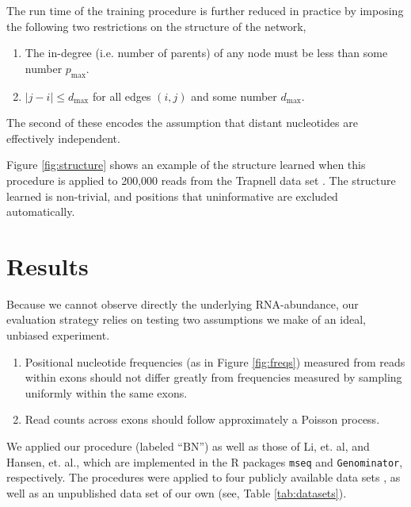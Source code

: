 \documentclass{bioinfo}
\begin{document}
The run time of the training procedure is further reduced in practice by imposing the
following two restrictions on the structure of the network,
\begin{enumerate}
\item The in-degree (i.e. number of parents) of any node must be less than some
number $p_{\text{max}}$.
\item $|j - i| \le d_{\text{max}}$ for all edges $(i,j)$ and some number $d_{\text{max}}$.
\end{enumerate}
The second of these encodes the assumption that distant nucleotides are
effectively independent.


\begin{comment}
\begin{figure*}
\begin{center}
\texttt{[image: fig/structure2.pdf]}
\end{center}
\caption{The network structure learned on the Trapnell data set, where 0 is the
read start. Dotted boxes represent positions not included in the model (i.e.
positions deemed uninformative).}
\label{fig:structure}
\end{figure*}
\end{comment}

Figure \ref{fig:structure} shows an example of the structure learned when this
procedure is applied to 200,000 reads from the Trapnell data set
\cite{Trapnell2010}. The structure learned is non-trivial, and
positions that uninformative are excluded automatically.


\section{Results}

Because we cannot observe directly the underlying RNA-abundance, our evaluation
strategy relies on testing two assumptions we make of an ideal, unbiased experiment.
\begin{enumerate}
\item Positional nucleotide frequencies (as in Figure \ref{fig:freqs}) measured
from reads within exons should not differ greatly from frequencies measured by
sampling uniformly within the same exons.
\item Read counts across exons should follow approximately a Poisson process.
\end{enumerate}

We applied our procedure (labeled ``BN'') as well as those of Li, et. al, and
Hansen, et. al., which are implemented in the R packages \texttt{mseq} and
\texttt{Genominator}, respectively. The procedures were applied to four publicly
available data sets \cite{Bullard2010} \cite{Mortazavi2008} \cite{Trapnell2010}
\cite{Wetterbom2010}, as well as an unpublished data set of our own (see, Table
\ref{tab:datasets}).
\end{document}
